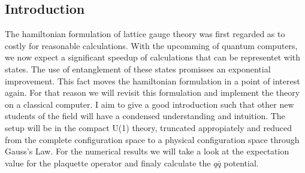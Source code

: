 \begin{strip}
	\section{Introduction}
	The hamiltonian formulation of lattice gauge theory was first regarded as to costly for reasonable calculations. With the upcomming of quantum computers, we now expect a significant speedup of calculations that can be representet with states. The use of entanglement of these states promisses an exponential improvement. This fact moves the hamiltonian formulation in a point of interest again. For that reason we will revisit this formulation and implement the theory on a classical computer.
	I aim to give a good introduction such that other new students of the field will have a condensed understanding and intuition. The setup will be in the compact U(1) theory, truncated appropiately and reduced from the complete configuration space to a physical configuration space through Gauss's Law.
	For the numerical results we will take a look at the expectation value for the plaquette operator and finaly calculate the $q\bar{q}$ potential.

\end{strip}
